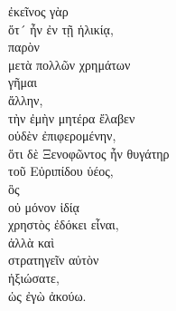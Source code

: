 {\large
\begin{greek}
\noindent ἐκεῖνος γὰρ \\
\tabto{2em} ὅτ´ ἦν ἐν τῇ ἡλικίᾳ, \\
παρὸν \\
\tabto{4em} μετὰ πολλῶν χρημάτων \\
\tabto{2em} γῆμαι \\
\tabto{4em} ἄλλην, \\
τὴν ἐμὴν μητέρα ἔλαβεν \\
\tabto{2em} οὐδὲν ἐπιφερομένην, \\
ὅτι δὲ Ξενοφῶντος ἦν θυγάτηρ \\
\tabto{2em} τοῦ Εὐριπίδου ὑέος, \\
\tabto{2em} ὃς \\
\tabto{4em} οὐ μόνον ἰδίᾳ \\
\tabto{4em} χρηστὸς ἐδόκει εἶναι, \\
\tabto{4em} ἀλλὰ καὶ \\
\tabto{6em} στρατηγεῖν αὐτὸν \\
\tabto{4em} ἠξιώσατε, \\
\tabto{6em} ὡς ἐγὼ ἀκούω.

\end{greek}
}

